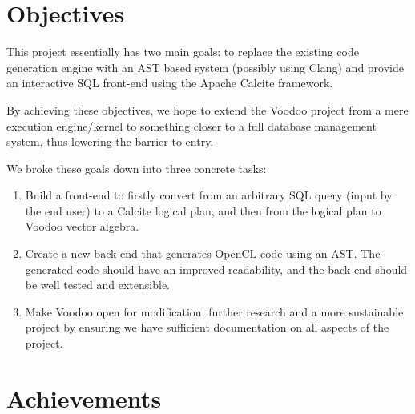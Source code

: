 \section{Objectives}

This project essentially has two main goals: to replace the existing code generation engine with an AST based system (possibly using Clang) and provide an interactive SQL front-end using the Apache Calcite framework.

By achieving these objectives, we hope to extend the Voodoo project from a mere execution engine/kernel to something closer to a full database management system, thus lowering the barrier to entry.

We broke these goals down into three concrete tasks:
\begin{enumerate}
    \item \label{obj1} Build a front-end to firstly convert from an arbitrary SQL query (input by the end user) to a Calcite logical plan, and then from the logical plan to Voodoo vector algebra.
    \item \label{obj2} Create a new back-end that generates OpenCL code using an AST. The generated code should have an improved readability, and the back-end should be well tested and extensible.
    \item \label{obj3} Make Voodoo open for modification, further research and a more sustainable project by ensuring we have sufficient documentation on all aspects of the project.
\end{enumerate}

\section{Achievements}

